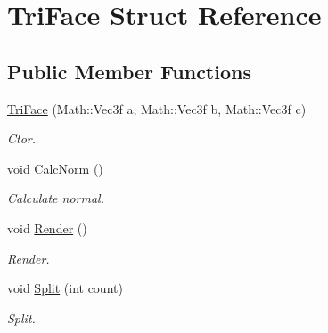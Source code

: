 \hypertarget{structTriFace}{
\section{TriFace Struct Reference}
\label{structTriFace}
}
\subsection*{Public Member Functions}
\begin{DoxyCompactItemize}
\item 
\hypertarget{structTriFace_ae6506458beee632432bc2756ec98339b}{
\hyperlink{structTriFace_ae6506458beee632432bc2756ec98339b}{TriFace} (Math::Vec3f a, Math::Vec3f b, Math::Vec3f c)}
\label{structTriFace_ae6506458beee632432bc2756ec98339b}

\begin{DoxyCompactList}\small\item\em Ctor. \item\end{DoxyCompactList}\item 
\hypertarget{structTriFace_a7c838f3a0124b9730d4a2c92fc8722d9}{
void \hyperlink{structTriFace_a7c838f3a0124b9730d4a2c92fc8722d9}{CalcNorm} ()}
\label{structTriFace_a7c838f3a0124b9730d4a2c92fc8722d9}

\begin{DoxyCompactList}\small\item\em Calculate normal. \item\end{DoxyCompactList}\item 
\hypertarget{structTriFace_ab538676824703f17e67a3b3c1860d098}{
void \hyperlink{structTriFace_ab538676824703f17e67a3b3c1860d098}{Render} ()}
\label{structTriFace_ab538676824703f17e67a3b3c1860d098}

\begin{DoxyCompactList}\small\item\em Render. \item\end{DoxyCompactList}\item 
void \hyperlink{structTriFace_adab6763fcdf11d4f7d7974fa8931801b}{Split} (int count)
\begin{DoxyCompactList}\small\item\em Split. \item\end{DoxyCompactList}\end{DoxyCompactItemize}
